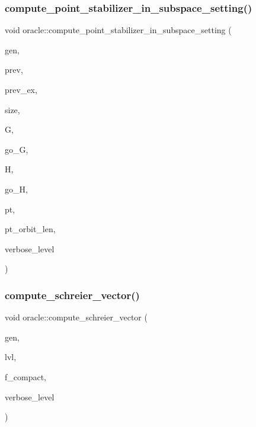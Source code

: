 \subsubsection{\texorpdfstring{compute\+\_\+point\+\_\+stabilizer\+\_\+in\+\_\+subspace\+\_\+setting()}{compute\_point\_stabilizer\_in\_subspace\_setting()}}
{\footnotesize\ttfamily void oracle\+::compute\+\_\+point\+\_\+stabilizer\+\_\+in\+\_\+subspace\+\_\+setting (\begin{DoxyParamCaption}\item[{\mbox{\hyperlink{classgenerator}{generator}} $\ast$}]{gen,  }\item[{\mbox{\hyperlink{galois_8h_a09fddde158a3a20bd2dcadb609de11dc}{I\+NT}}}]{prev,  }\item[{\mbox{\hyperlink{galois_8h_a09fddde158a3a20bd2dcadb609de11dc}{I\+NT}}}]{prev\+\_\+ex,  }\item[{\mbox{\hyperlink{galois_8h_a09fddde158a3a20bd2dcadb609de11dc}{I\+NT}}}]{size,  }\item[{\mbox{\hyperlink{classgroup}{group}} \&}]{G,  }\item[{\mbox{\hyperlink{classlonginteger__object}{longinteger\+\_\+object}} \&}]{go\+\_\+G,  }\item[{\mbox{\hyperlink{classgroup}{group}} \&}]{H,  }\item[{\mbox{\hyperlink{classlonginteger__object}{longinteger\+\_\+object}} \&}]{go\+\_\+H,  }\item[{\mbox{\hyperlink{galois_8h_a09fddde158a3a20bd2dcadb609de11dc}{I\+NT}}}]{pt,  }\item[{\mbox{\hyperlink{galois_8h_a09fddde158a3a20bd2dcadb609de11dc}{I\+NT}}}]{pt\+\_\+orbit\+\_\+len,  }\item[{\mbox{\hyperlink{galois_8h_a09fddde158a3a20bd2dcadb609de11dc}{I\+NT}}}]{verbose\+\_\+level }\end{DoxyParamCaption})}

\mbox{\label{classoracle_a1ba7d398b51ed70f89b5ea54adb7b089}} 
\subsubsection{\texorpdfstring{compute\+\_\+schreier\+\_\+vector()}{compute\_schreier\_vector()}}
{\footnotesize\ttfamily void oracle\+::compute\+\_\+schreier\+\_\+vector (\begin{DoxyParamCaption}\item[{\mbox{\hyperlink{classgenerator}{generator}} $\ast$}]{gen,  }\item[{\mbox{\hyperlink{galois_8h_a09fddde158a3a20bd2dcadb609de11dc}{I\+NT}}}]{lvl,  }\item[{\mbox{\hyperlink{galois_8h_a09fddde158a3a20bd2dcadb609de11dc}{I\+NT}}}]{f\+\_\+compact,  }\item[{\mbox{\hyperlink{galois_8h_a09fddde158a3a20bd2dcadb609de11dc}{I\+NT}}}]{verbose\+\_\+level }\end{DoxyParamCaption})}

